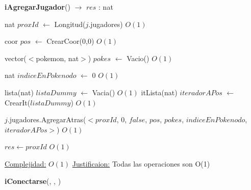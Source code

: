 \begin{Algoritmos}
\begin{algorithm}[H]
\begin{algorithmic}[1]
\end{algorithmic}
\end{algorithm}


\begin{algorithm}[H]
{\textbf{iAgregarJugador}() $\to$ $res$ : nat}
\begin{algorithmic}[1]

\State nat $proxId$ $\gets$ Longitud($j$.jugadores)   \Comment $O(1)$


\State coor $pos$ $\gets$ CrearCoor(0,0) \Comment $O(1)$

\State vector($<$pokemon, nat$>$) $pokes$ $\gets$ Vacio() \Comment $O(1)$
 
\State nat $indiceEnPokenodo$ $\gets$ 0  \Comment $O(1)$

\State lista(nat) $listaDummy$ $\gets$ Vacia() \Comment $O(1)$
\State itLista(nat) $iteradorAPos$ $\gets$ CrearIt($listaDummy$) \Comment $O(1)$

\State $j$.jugadores.AgregarAtras($<proxId$, 0, $false$, $pos$, $pokes$, $indiceEnPokenodo$, $iteradorAPos>$) \Comment $O(1)$

\State $res \gets proxId$ \Comment $O(1)$

\medskip
\State \underline{Complejidad:} $O(1)$
\State \underline{Justificaion:} Todas las operaciones son O(1)

\end{algorithmic}
\end{algorithm}

\begin{algorithm}[H]
{\textbf{iConectarse}(, , )}
\begin{algorithmic}[1]


\end{algorithmic}
\end{algorithm}
\end{Algoritmos}
